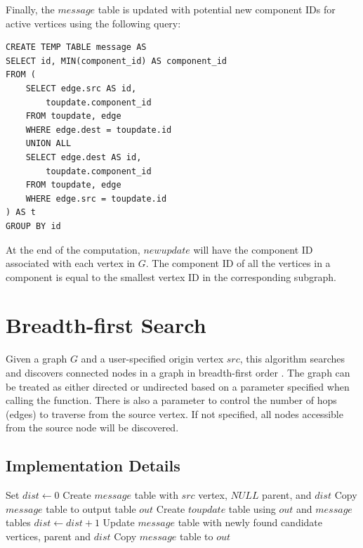 Finally, the $message$ table is updated with potential new
component IDs for active vertices using the following query:

\begin{algorithm}
\begin{lstlisting}
CREATE TEMP TABLE message AS
SELECT id, MIN(component_id) AS component_id
FROM (
    SELECT edge.src AS id,
        toupdate.component_id
    FROM toupdate, edge
    WHERE edge.dest = toupdate.id
    UNION ALL
    SELECT edge.dest AS id,
        toupdate.component_id
    FROM toupdate, edge
    WHERE edge.src = toupdate.id
) AS t
GROUP BY id
\end{lstlisting}
\end{algorithm}

At the end of the computation, $newupdate$ will have the component ID
associated with each vertex in $G$. The component ID of all the vertices
in a component is equal to the smallest vertex ID in the corresponding
subgraph.

\section{Breadth-first Search} \label{sec:graph:bfs}

Given a graph $G$ and a user-specified origin vertex $src$, this algorithm
searches and discovers connected nodes in a graph in breadth-first order
\cite{bfs_wikipedia}. The graph can be treated as either directed or
undirected based on a parameter specified when calling the function.
There is also a parameter to control the number of hops (edges) to traverse
from the source vertex. If not specified, all nodes accessible from the
source node will be discovered.

\subsection{Implementation Details}
\begin{algorithm} \label{alg:bfs:high}
\begin{algorithmic}[1]
    \State Set $dist \leftarrow 0$
    \State Create $message$ table with $src$ vertex, $NULL$ parent, and $dist$
    \State Copy $message$ table to output table $out$
    \Repeat
        \State Create $toupdate$ table using $out$ and $message$ tables
        \State $dist \leftarrow dist + 1$
        \State Update $message$ table with newly found candidate vertices, parent and $dist$
        \State Copy $message$ table to $out$
\end{algorithmic}
\end{algorithm}

